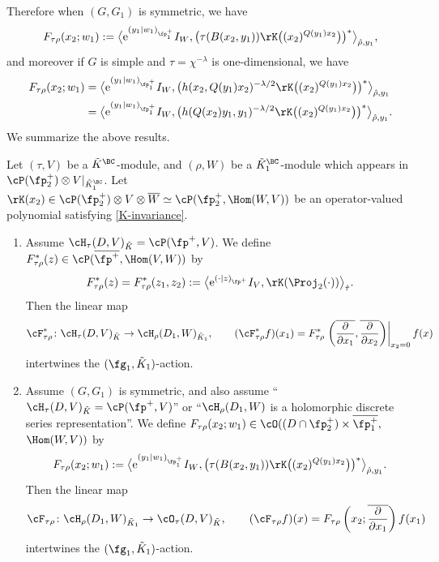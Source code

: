 Therefore when $(G,G_1)$ is symmetric, we have
\begin{gather*}
 F_{\tau\rho}(x_2;w_1)
:=\big\langle {\rm e}^{(y_1|w_1)_{\fp^+_1}}I_W,\bigl(\tau(B(x_2,y_1))\rK\big((x_2)^{Q(y_1)x_2}\big) \bigr)^*\big\rangle_{\hat{\rho},y_1},
\end{gather*}
and moreover if $G$ is simple and $\tau=\chi^{-\lambda}$ is one-dimensional, we have
\begin{align*}
F_{\tau\rho}(x_2;w_1)&=\big\langle {\rm e}^{(y_1|w_1)_{\fp^+_1}}I_W,
\big(h(x_2,Q(y_1)x_2)^{-\lambda/2}\rK\big((x_2)^{Q(y_1)x_2}\big)\big)^*\big\rangle_{\hat{\rho},y_1}\\
&=\big\langle {\rm e}^{(y_1|w_1)_{\fp^+_1}}I_W,
\big(h(Q(x_2)y_1,y_1)^{-\lambda/2}\rK\big((x_2)^{Q(y_1)x_2}\big)\big)^*\big\rangle_{\hat{\rho},y_1}.
\end{align*}
We summarize the above results.
\begin{Theorem}\label{main}
Let $(\tau,V)$ be a $\tilde{K}^\BC$-module, and $(\rho,W)$ be a $\tilde{K}_1^\BC$-module
which appears in $\cP(\fp^+_2)\otimes V|_{\tilde{K}_1^\BC}$.
Let $\rK(x_2)\in \cP(\fp^+_2)\otimes V\otimes\overline{W}\simeq\cP(\fp^+_2,\Hom(W,V))$ be an operator-valued polynomial
satisfying \eqref{K-invariance}.
\begin{enumerate}\itemsep=0pt
\item[$(1)$] Assume $\cH_\tau(D,V)_{\tilde{K}}=\cP(\fp^+,V)$.
We define $F_{\tau\rho}^*(z)\in\cP(\overline{\fp^+},\Hom(V,W))$ by
\begin{gather*} F_{\tau\rho}^*(z)=F_{\tau\rho}^*(z_1,z_2):=\big\langle {\rm e}^{(\cdot|z)_{\fp^+}}I_V,\rK(\Proj_2(\cdot))\big\rangle_{\hat{\tau}}. \end{gather*}
Then the linear map
\begin{gather*}
\cF_{\tau\rho}^*\colon \cH_\tau(D,V)_{\tilde{K}}\to\cH_\rho(D_1,W)_{\tilde{K}_1}, \qquad
(\cF_{\tau\rho}^*f)(x_1)
=F_{\tau\rho}^*\left.\left(\overline{\frac{\partial}{\partial x_1}},\overline{\frac{\partial}{\partial x_2}}\right)\right|_{x_2=0}f(x)
\end{gather*}
intertwines the $(\fg_1,\tilde{K}_1)$-action.
\item[$(2)$] Assume $(G,G_1)$ is symmetric, and also assume ``$\cH_\tau(D,V)_{\tilde{K}}=\cP(\fp^+,V)$'' or ``$\cH_\rho(D_1,W)$ is
a holomorphic discrete series representation''.
We define $F_{\tau\rho}(x_2;w_1)\in\cO((D\cap\fp^+_2)\times\overline{\fp^+_1},$ $\Hom(W,V))$ by
\begin{gather*}
 F_{\tau\rho}(x_2;w_1)
:=\big\langle {\rm e}^{(y_1|w_1)_{\fp^+_1}}I_W,\bigl(\tau(B(x_2,y_1))\rK\big((x_2)^{Q(y_1)x_2}\big)\bigr)^*\big\rangle_{\hat{\rho},y_1}.
\end{gather*}
Then the linear map
\begin{gather*}
\cF_{\tau\rho}\colon \cH_\rho(D_1,W)_{\tilde{K}_1}\to \cO_\tau(D,V)_{\tilde{K}}, \qquad
(\cF_{\tau\rho}f)(x) =F_{\tau\rho}\left(x_2;\overline{\frac{\partial}{\partial x_1}}\right)f(x_1)
\end{gather*}
intertwines the $(\fg_1,\tilde{K}_1)$-action.
\end{enumerate}
\end{Theorem}

